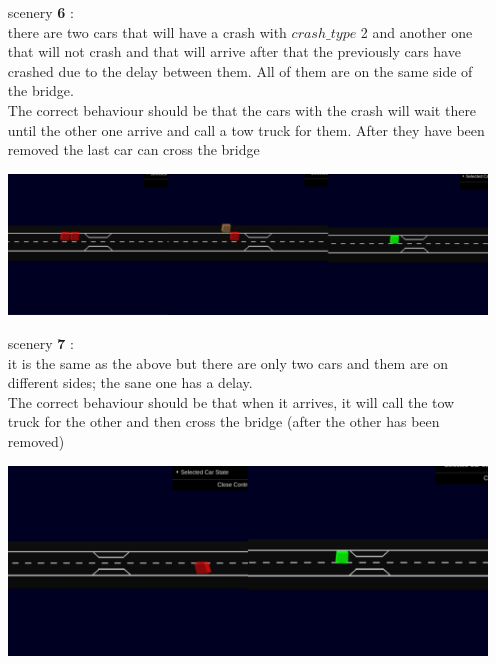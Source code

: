 \begin{itemize}
\begin{center}
    \end{center}
    \item[scenery \textbf{6}]: \\ there are two cars that will have a crash with $crash\_type$ 2 and another one that will not
    crash and that will arrive after that the previously cars have crashed due to the delay between them. All of them are on the same 
    side of the bridge. \\ The correct behaviour should be that the cars with 
    the crash will wait there until the other one arrive and call a tow truck for them. After they have been removed
    the last car can cross the bridge \\
    \begin{center}
        \includegraphics[scale=0.3, width=\linewidth]{assets/sc6.jpg}
    \end{center}
    \item[scenery \textbf{7}]: \\ it is the same as the above but there are only two cars and them are on different sides; the 
    sane one has a delay. \\ The correct behaviour should be that when it arrives, it will call the tow truck for
    the other and then cross the bridge (after the other has been removed) \\
    \begin{center}
        \includegraphics[scale=0.3, width=\linewidth]{assets/sc7.jpg}
    \end{center}

\end{itemize}
